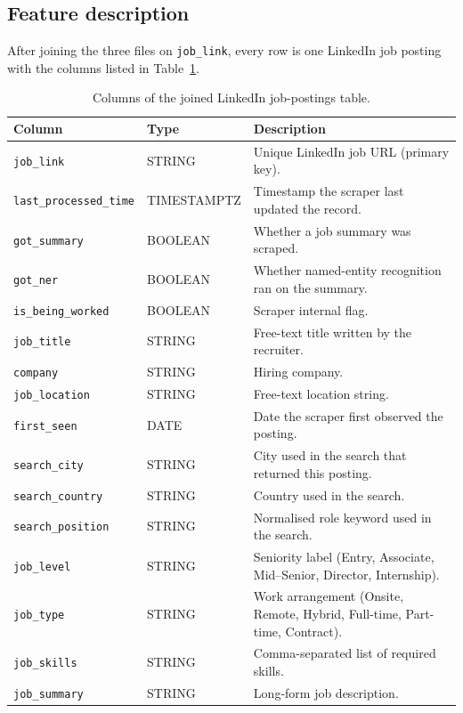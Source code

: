 \documentclass[11pt,a4paper]{article}
\begin{document}
\subsection{Feature description}
After joining the three files on \texttt{job\_link}, every row is one
LinkedIn job posting with the columns listed in Table~\ref{tab:cols}.

\begin{table}[h]
\centering
\caption{Columns of the joined LinkedIn job-postings table.}
\label{tab:cols}
\small
\begin{tabularx}{\linewidth}{l l X}
\toprule
\textbf{Column} & \textbf{Type} & \textbf{Description} \\
\midrule
\texttt{job\_link}            & STRING     & Unique LinkedIn job URL (primary key). \\
\texttt{last\_processed\_time}& TIMESTAMPTZ& Timestamp the scraper last updated the record. \\
\texttt{got\_summary}         & BOOLEAN    & Whether a job summary was scraped. \\
\texttt{got\_ner}             & BOOLEAN    & Whether named-entity recognition ran on the summary. \\
\texttt{is\_being\_worked}    & BOOLEAN    & Scraper internal flag. \\
\texttt{job\_title}           & STRING     & Free-text title written by the recruiter. \\
\texttt{company}              & STRING     & Hiring company. \\
\texttt{job\_location}        & STRING     & Free-text location string. \\
\texttt{first\_seen}          & DATE       & Date the scraper first observed the posting. \\
\texttt{search\_city}         & STRING     & City used in the search that returned this posting. \\
\texttt{search\_country}      & STRING     & Country used in the search. \\
\texttt{search\_position}     & STRING     & Normalised role keyword used in the search. \\
\texttt{job\_level}           & STRING     & Seniority label (Entry, Associate, Mid--Senior, Director, Internship). \\
\texttt{job\_type}            & STRING     & Work arrangement (Onsite, Remote, Hybrid, Full-time, Part-time, Contract). \\
\texttt{job\_skills}          & STRING     & Comma-separated list of required skills. \\
\texttt{job\_summary}         & STRING     & Long-form job description. \\
\bottomrule
\end{tabularx}
\end{table}
\end{document}
